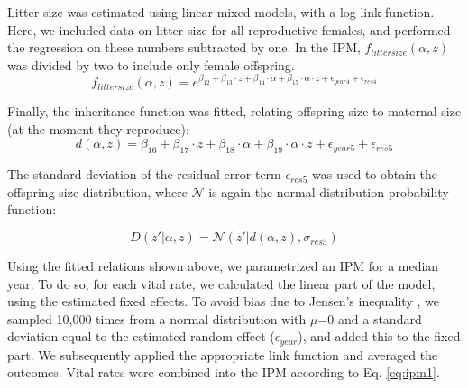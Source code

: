 Litter size was estimated using linear mixed models, with a log link function. Here, we included data on litter size for all reproductive females, and performed the regression on these numbers subtracted by one. In the IPM, $f_{litter size}(\alpha,z)$ was divided by two to include only female offspring.
\begin{equation}
f_{litter size}(\alpha,z) = e^{\beta_{12} + \beta_{13} \cdot z + \beta_{14} \cdot \alpha + \beta_{15} \cdot \alpha \cdot z + \epsilon_{year4} + \epsilon_{res4}}
\end{equation}

Finally, the inheritance function was fitted, relating offspring size to maternal size (at the moment they reproduce):
\begin{equation}
d(\alpha,z) = \beta_{16} + \beta_{17} \cdot z + \beta_{18} \cdot \alpha + \beta_{19} \cdot \alpha \cdot z + \epsilon_{year5} + \epsilon_{res5}
\end{equation}

The standard deviation of the residual error term $\epsilon_{res5}$ was used to obtain the offspring size distribution, where $\mathcal{N}$ is again the normal distribution probability function:

\begin{equation}
D(z'|\alpha,z) = \mathcal{N}(z'|d(\alpha,z),\sigma_{res5})
\end{equation}

Using the fitted relations shown above, we parametrized an IPM for a median year. To do so, for each vital rate, we calculated the linear part of the model, using the estimated fixed effects. To avoid bias due to Jensen's inequality \parencite[e.g.][]{Fox2002}, we sampled 10,000 times from a normal distribution with $\mu$=0 and a standard deviation equal to the estimated random effect ($\epsilon_{year}$), and added this to the fixed part. We subsequently applied the appropriate link function and averaged the outcomes. Vital rates were combined into the IPM according to Eq. \ref{eq:ipm1}.




